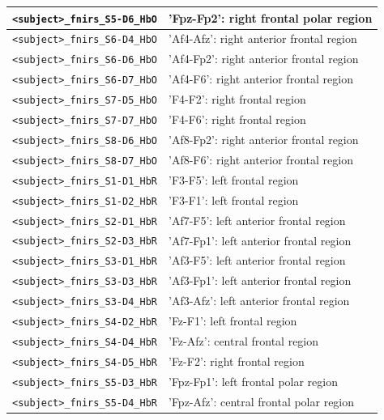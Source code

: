 \begin{table}
\begin{tabularx}{\textwidth}{|l|X|}
    \hline
    \texttt{<subject>\_fnirs\_S5-D6\_HbO} & 'Fpz-Fp2': right frontal polar region  \\
    \hline
    \texttt{<subject>\_fnirs\_S6-D4\_HbO} & 'Af4-Afz': right anterior frontal region  \\
    \hline
    \texttt{<subject>\_fnirs\_S6-D6\_HbO} & 'Af4-Fp2': right anterior frontal region  \\
    \hline
    \texttt{<subject>\_fnirs\_S6-D7\_HbO} & 'Af4-F6': right anterior frontal region  \\
    \hline
    \texttt{<subject>\_fnirs\_S7-D5\_HbO} & 'F4-F2': right frontal region  \\
    \hline
    \texttt{<subject>\_fnirs\_S7-D7\_HbO} & 'F4-F6': right frontal region  \\
    \hline
    \texttt{<subject>\_fnirs\_S8-D6\_HbO} & 'Af8-Fp2': right anterior frontal region  \\
    \hline
    \texttt{<subject>\_fnirs\_S8-D7\_HbO} & 'Af8-F6': right anterior frontal region  \\
    \hline
    \texttt{<subject>\_fnirs\_S1-D1\_HbR} & 'F3-F5': left frontal region  \\
    \hline
    \texttt{<subject>\_fnirs\_S1-D2\_HbR} & 'F3-F1': left frontal region  \\
    \hline
    \texttt{<subject>\_fnirs\_S2-D1\_HbR} & 'Af7-F5': left anterior frontal region  \\
    \hline
    \texttt{<subject>\_fnirs\_S2-D3\_HbR} & 'Af7-Fp1': left anterior frontal region  \\
    \hline
    \texttt{<subject>\_fnirs\_S3-D1\_HbR} & 'Af3-F5': left anterior frontal region  \\
    \hline
    \texttt{<subject>\_fnirs\_S3-D3\_HbR} & 'Af3-Fp1': left anterior frontal region  \\
    \hline
    \texttt{<subject>\_fnirs\_S3-D4\_HbR} & 'Af3-Afz': left anterior frontal region  \\
    \hline
    \texttt{<subject>\_fnirs\_S4-D2\_HbR} & 'Fz-F1': left frontal region  \\
    \hline
    \texttt{<subject>\_fnirs\_S4-D4\_HbR} & 'Fz-Afz': central frontal region  \\
    \hline
    \texttt{<subject>\_fnirs\_S4-D5\_HbR} & 'Fz-F2': right frontal region  \\
    \hline
    \texttt{<subject>\_fnirs\_S5-D3\_HbR} & 'Fpz-Fp1': left frontal polar region  \\
    \hline
    \texttt{<subject>\_fnirs\_S5-D4\_HbR} & 'Fpz-Afz': central frontal polar region  \\

\end{tabularx}
\end{table}
